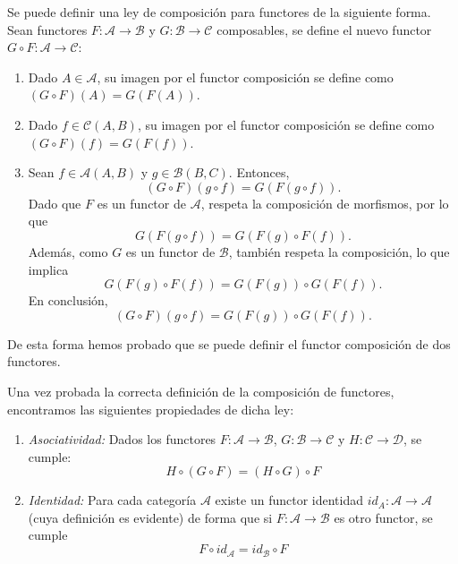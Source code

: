 \begin{observacion}
    Se puede definir una ley de composición para functores de la siguiente forma. Sean functores $F: \mathscr{A} \longrightarrow \mathscr{B}$ y $G: \mathscr{B} \longrightarrow \mathscr{C}$ composables, se define el nuevo functor $G \circ F: \mathscr{A} \longrightarrow \mathscr{C}$:

    \begin{enumerate}
        \item Dado $A \in \mathscr{A}$, su imagen por el functor composición se define como $(G \circ F)(A) = G(F(A))$.
        \item Dado $f \in \mathscr{C}(A,B)$, su imagen por el functor composición se define como $(G \circ F)(f) = G(F(f))$.
        \item Sean $ f \in \mathscr{A}(A, B) $ y $ g \in \mathscr{B}(B, C) $. Entonces,
        $$
            (G \circ F)(g \circ f) = G(F(g \circ f)).
        $$
        Dado que $ F $ es un functor de $ \mathscr{A} $, respeta la composición de morfismos, por lo que
        $$
            G(F(g \circ f)) = G(F(g) \circ F(f)).
        $$
        Además, como $ G $ es un functor de $ \mathscr{B} $, también respeta la composición, lo que implica
        $$
            G(F(g) \circ F(f)) = G(F(g)) \circ G(F(f)).
        $$
        En conclusión,
        $$
            (G \circ F)(g \circ f) = G(F(g)) \circ G(F(f)).
        $$
        
    \end{enumerate}

    De esta forma hemos probado que se puede definir el functor composición de dos functores.

\end{observacion}

\begin{observacion}
    Una vez probada la correcta definición de la composición de functores, encontramos las siguientes propiedades de dicha ley:
    \begin{enumerate}
        \item \textit{Asociatividad: } Dados los functores $F: \mathscr{A} \longrightarrow \mathscr{B}$, $G: \mathscr{B} \longrightarrow \mathscr{C}$ y $H: \mathscr{C} \longrightarrow \mathscr{D}$, se cumple: \begin{equation}
            H \circ (G \circ F) = (H \circ G) \circ F   
        \end{equation}
        \item \textit{Identidad: } Para cada categoría $\mathscr{A}$ existe un functor identidad $id_A: \mathscr{A} \longrightarrow \mathscr{A}$ (cuya definición es evidente) de forma que si $F: \mathscr{A} \longrightarrow \mathscr{B}$ es otro functor, se cumple \begin{equation}
            F \circ id_{\mathscr{A}} = id_{\mathscr{B}} \circ F 
        \end{equation} 
    \end{enumerate}
\end{observacion}

